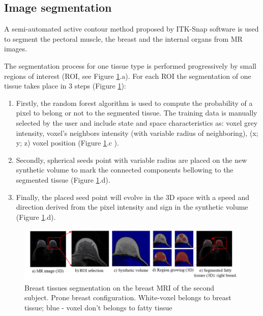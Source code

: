 \subsection{Image segmentation}%

A semi-automated active contour method proposed by ITK-Snap software is used to segment the pectoral muscle, the breast and the internal organs from MR images. 

The segmentation process for one tissue type is performed progressively by small regions of interest (ROI, see Figure \ref{fig:breasttissuessegmentation}.a). For each ROI the segmentation of one tissue takes place in 3 steps (Figure \ref{fig:breasttissuessegmentation}):
\begin{enumerate}
\item Firstly, the random forest algorithm is used to compute the probability of a pixel to belong or not to the segmented tissue. The training data is manually selected by the user and include state and space characteristics as: voxel grey intensity, voxel's neighbors intensity (with variable radius of neighboring), (x; y; z) voxel position (Figure \ref{fig:breasttissuessegmentation}.c ).

\item Secondly, spherical seeds point with variable radius are placed on the new synthetic volume to mark the connected components bellowing to the segmented tissue (Figure \ref{fig:breasttissuessegmentation}.d).
\item Finally, the placed seed point will evolve in the 3D space with a speed and direction derived from the pixel intensity and sign in the synthetic volume (Figure \ref{fig:breasttissuessegmentation}.d).
\end{enumerate}

 
 \begin{figure}[H]
\centering
\includegraphics[width=1\textwidth,keepaspectratio]{figures/tissues_segmentation.png} 
\caption{Breast tissues segmentation on the breast MRI of the second subject. Prone breast configuration. White-voxel belongs to breast tissue; blue - voxel don't belongs to fatty tissue} \label{fig:breasttissuessegmentation}
\end{figure}

